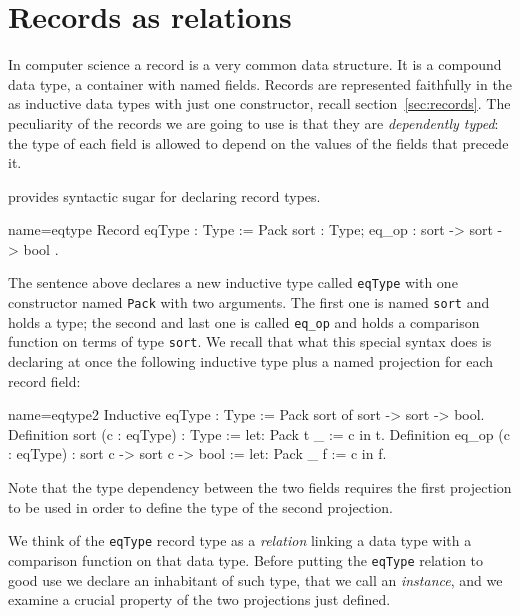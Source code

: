 \section{Records as relations}\label{sec:eqtype}

In computer science a record is a very common data structure.  It is a
compound data type, a container with named fields.  Records are
represented faithfully in the \mcbCIC{} as
inductive data types with just one constructor,
recall section~\ref{sec:records}.
The peculiarity of the records we are going to use is that they are
\emph{dependently typed}: the type of each field is allowed to depend on
the values of the fields that precede it.

\Coq{} provides syntactic sugar for declaring record types.

\begin{coq}{name=eqtype}{}
Record eqType : Type := Pack {
  sort : Type;
  eq_op : sort -> sort -> bool
}.
\end{coq}
\label{eqtype:noproof}

The sentence above declares a new inductive type called
\lstinline/eqType/ with one constructor named
\lstinline/Pack/ with two arguments.  The first one
is named \lstinline/sort/ and holds a type; the second and last
one is called \lstinline/eq_op/ and holds a comparison function
on terms of type \lstinline/sort/.  We recall that what this special syntax
does is declaring at once the following inductive type plus
a named projection for each record field:

\begin{coq}{name=eqtype2}{}
Inductive eqType : Type :=
  Pack sort of sort -> sort -> bool.
Definition sort (c : eqType) : Type :=
  let: Pack t _ := c in t.
Definition eq_op (c : eqType) : sort c -> sort c -> bool :=
  let: Pack _ f := c in f.
\end{coq}

Note that the type dependency between the two fields requires the first
projection to be used in order to define the type of the second projection.

We think of the \lstinline/eqType/ record type as a \emph{relation}
linking a
data type with a comparison function on that data type.  Before
putting the \lstinline/eqType/ relation to good use we declare an
inhabitant of such type, that we call an \emph{instance}, and we
examine a crucial property of the two projections just defined.

